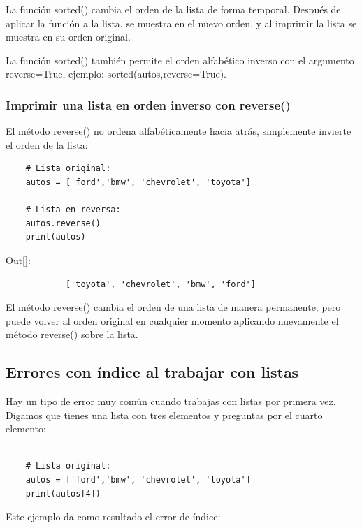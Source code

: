 La función  {\ttfamily sorted()}  cambia el orden de la lista de forma temporal. Después de aplicar la función  a la lista,  se muestra en el nuevo orden, y al imprimir la lista se muestra en su orden original.

La función  {\ttfamily sorted()} también permite el orden alfabético inverso con el argumento  {\ttfamily reverse=True}, ejemplo: 
{\ttfamily sorted(autos,reverse=True)}.

\subsubsection{Imprimir una lista en orden inverso con reverse()}

El método {\ttfamily  reverse()}  no ordena alfabéticamente hacia atrás,  simplemente
invierte el orden de la lista:

\hspace{-2.4cm}{\ttfamily \scriptsize invierte.py}\vspace{-0.5cm}
\begin{lstlisting}	
	# Lista original:
	autos = ['ford','bmw', 'chevrolet', 'toyota']
	
	# Lista en reversa:
	autos.reverse()
	print(autos)
\end{lstlisting}	

{\ttfamily\scriptsize\scriptsize 
	\hspace{-0.65cm}Out[]:\vspace{-0.2cm}	
	{\color{blue} 	
		\begin{verbatim}
			['toyota', 'chevrolet', 'bmw', 'ford']
		\end{verbatim}
}}
El método  {\ttfamily  reverse()}  cambia el orden de una lista de manera permanente; pero puede  volver al orden original en cualquier momento aplicando nuevamente el método {\ttfamily  reverse()} sobre la lista.



\subsection{Errores con índice al trabajar con listas}

Hay un tipo de error muy común cuando trabajas con listas por primera vez. Digamos que tienes una lista con tres elementos y preguntas por el cuarto elemento:

\begin{lstlisting}
	
	# Lista original:
	autos = ['ford','bmw', 'chevrolet', 'toyota']
	print(autos[4])
\end{lstlisting}
Este ejemplo da como resultado el error de índice:

